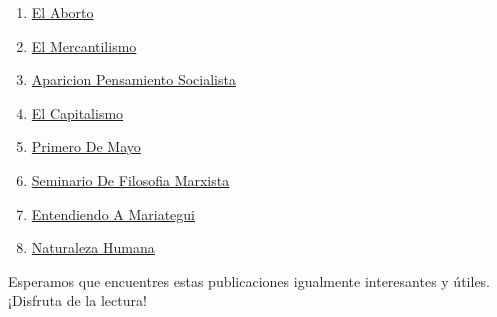 \documentclass[
  jou,
  floatsintext,
  longtable,
  a4paper,
  nolmodern,
  notxfonts,
  notimes,
  12pt,
  colorlinks=true,linkcolor=blue,citecolor=blue,urlcolor=blue]{apa7}
\providecommand{\tightlist}{%
  \setlength{\itemsep}{0pt}\setlength{\parskip}{0pt}}
\begin{document}
\begin{enumerate}
\def\labelenumi{\arabic{enumi}.}
\tightlist
\item
  \href{https://dialectica-y-mercado.netlify.app/posts/2015-05-14-el-aborto/index.pdf}{}
  \href{https://dialectica-y-mercado.netlify.app/posts/2015-05-14-el-aborto}{El
  Aborto}
\item
  \href{https://dialectica-y-mercado.netlify.app/posts/2017-05-23-el-mercantilismo/index.pdf}{}
  \href{https://dialectica-y-mercado.netlify.app/posts/2017-05-23-el-mercantilismo}{El
  Mercantilismo}
\item
  \href{https://dialectica-y-mercado.netlify.app/posts/2018-04-23-aparicion-pensamiento-socialista/index.pdf}{}
  \href{https://dialectica-y-mercado.netlify.app/posts/2018-04-23-aparicion-pensamiento-socialista}{Aparicion
  Pensamiento Socialista}
\item
  \href{https://dialectica-y-mercado.netlify.app/posts/2023-03-03-el-capitalismo/index.pdf}{}
  \href{https://dialectica-y-mercado.netlify.app/posts/2023-03-03-el-capitalismo}{El
  Capitalismo}
\item
  \href{https://dialectica-y-mercado.netlify.app/posts/2023-04-29-primero-de-mayo/index.pdf}{}
  \href{https://dialectica-y-mercado.netlify.app/posts/2023-04-29-primero-de-mayo}{Primero
  De Mayo}
\item
  \href{https://dialectica-y-mercado.netlify.app/posts/2023-05-19-seminario-de-filosofia-marxista/index.pdf}{}
  \href{https://dialectica-y-mercado.netlify.app/posts/2023-05-19-seminario-de-filosofia-marxista}{Seminario
  De Filosofia Marxista}
\item
  \href{https://dialectica-y-mercado.netlify.app/posts/2023-06-09-entendiendo-a-mariategui/index.pdf}{}
  \href{https://dialectica-y-mercado.netlify.app/posts/2023-06-09-entendiendo-a-mariategui}{Entendiendo
  A Mariategui}
\item
  \href{https://dialectica-y-mercado.netlify.app/posts/2023-06-09-naturaleza-humana/index.pdf}{}
  \href{https://dialectica-y-mercado.netlify.app/posts/2023-06-09-naturaleza-humana}{Naturaleza
  Humana}
\end{enumerate}

Esperamos que encuentres estas publicaciones igualmente interesantes y
útiles. ¡Disfruta de la lectura!
\end{document}
